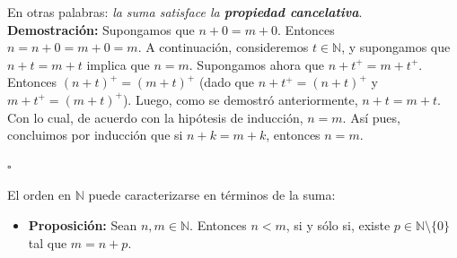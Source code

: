 \documentclass[10 pt]{article}
\begin{document}
\Large{En otras palabras: \textit{la suma satisface la \textbf{propiedad cancelativa}}.} \\

\Large{\textbf{Demostración:} Supongamos que $n+0=m+0$.  Entonces $n=n+0=m+0=m$. A continuación, consideremos $t \in \mathbb N$, y supongamos que $n+t=m+t$ implica que $n=m$. Supongamos ahora que $n+t^+=m+t^+$. Entonces $(n+t)^+=(m+t)^+$ (dado que $n+t^+=(n+t)^+$ y $m+t^+=(m+t)^+$). Luego, como se demostró anteriormente, $n+t=m+t$. Con lo cual, de acuerdo con la hipótesis de inducción, $n=m$. Así pues, concluimos por inducción que si $n+k=m+k$, entonces $n=m$.} \\

\begin{flushright}
    $\square$
\end{flushright}

\Large{El orden en $\mathbb N$ puede caracterizarse en términos de la suma:} \\

\begin{itemize}
    \item \Large{\textbf{Proposición:} Sean $n,m \in \mathbb N$. Entonces $n<m$, si y sólo si, existe $p \in \mathbb N \setminus \{0\}$ tal que $m=n+p$.} \\
\end{itemize}
\end{document}
